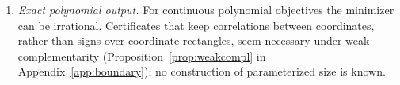 \begin{enumerate}[label=(\arabic*)]
function $f'$? For optimal sets with continuous components, the grids
produced by filtering can need a number of nodes that grows with the accuracy
(Proposition~\ref{lim:prop:setgrowth}); which compact descriptions beyond the
classes of Section~\ref{sec:optsets} can be computed with a decomposition?
\item \emph{Exact polynomial output.} For continuous polynomial objectives the
minimizer can be irrational. Certificates that keep correlations between
coordinates, rather than signs over coordinate rectangles, seem necessary
under weak complementarity (Proposition~\ref{prop:weakcompl} in
Appendix~\ref{app:boundary}); no construction of parameterized size is known.
\end{enumerate}
